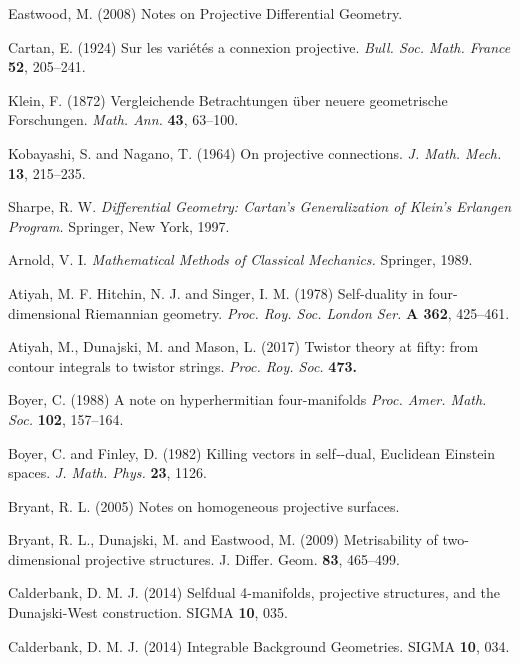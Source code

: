 
\begin{thebibliography}{}

 Eastwood, M. (2008)
Notes on Projective Differential Geometry.

 Cartan, E. (1924)
Sur les vari\'et\'es a connexion projective.
\textit{Bull. Soc. Math. France} {\bf 52}, 205--241.

 Klein, F. (1872)
Vergleichende Betrachtungen \"uber neuere geometrische Forschungen. \textit{Math. Ann.} {\bf 43}, 63--100.

 Kobayashi, S. and Nagano, T. (1964)
On projective connections. \textit{J. Math. Mech.} {\bf 13}, 215--235.

 Sharpe, R. W.
\textit{Differential Geometry: Cartan's Generalization of Klein's Erlangen Program.} Springer, New York, 1997.

Arnold, V. I.
\textit{Mathematical Methods of Classical Mechanics.} Springer, 1989.

Atiyah, M. F.  Hitchin, N. J. and  Singer, I. M. (1978) 
Self-duality in four-dimensional Riemannian geometry. \textit{Proc. Roy. Soc. London Ser.} {\bf A 362},  425--461.

Atiyah, M., Dunajski, M. and Mason, L. (2017)
Twistor theory at fifty: from contour integrals to twistor strings. \textit{Proc. Roy. Soc.} {\bf 473.}


 Boyer, C. (1988)
A note on hyperhermitian four-manifolds \textit{Proc. Amer. Math. Soc.} {\bf 102},
157--164.

 Boyer, C. and Finley, D. (1982)
Killing vectors in self‐-dual, Euclidean Einstein spaces. \textit{J. Math. Phys.} {\bf 23}, 1126.

  Bryant, R. L. (2005)
Notes on homogeneous projective surfaces.

 Bryant, R. L., Dunajski, M. and Eastwood, M. (2009)
Metrisability of two-dimensional projective structures.
J. Differ. Geom. {\bf 83}, 465--499.


 Calderbank, D. M. J. (2014)
Selfdual 4-manifolds, projective structures, and the Dunajski-West construction. SIGMA {\bf 10}, 035.

 Calderbank, D. M. J. (2014)
Integrable Background Geometries. SIGMA {\bf 10}, 034.


\end{thebibliography}
